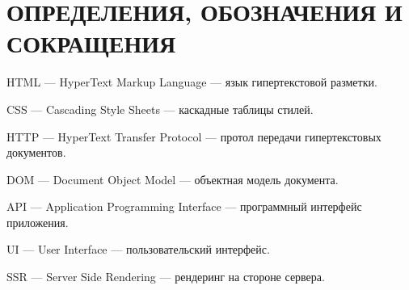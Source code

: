 \section*{ОПРЕДЕЛЕНИЯ, ОБОЗНАЧЕНИЯ И СОКРАЩЕНИЯ}

HTML --- HyperText Markup Language --- язык гипертекстовой разметки.

CSS --- Cascading Style Sheets --- каскадные таблицы стилей.

HTTP --- HyperText Transfer Protocol --- протол передачи гипертекстовых документов.

DOM --- Document Object Model --- объектная модель документа.

API  --- Application Programming Interface --- программный интерфейс приложения.

UI --- User Interface --- пользовательский интерфейс.

SSR --- Server Side Rendering --- рендеринг на стороне сервера.



\pagebreak